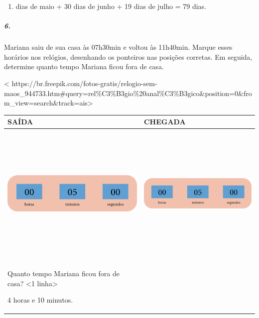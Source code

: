 \begin{enumerate}
\def\labelenumi{\arabic{enumi}.}
\setcounter{enumi}{30}
\item
  dias de maio + 30 dias de junho + 19 dias de julho = 79 dias.
\end{enumerate}

\subparagraph{6.}\label{section-48}

Mariana saiu de sua casa às 07h30min e voltou às 11h40min. Marque esses
horários nos relógios, desenhando os ponteiros nas posições
corretas. Em seguida, determine quanto tempo Mariana ficou fora de casa.

\textless{}
https://br.freepik.com/fotos-gratis/relogio-sem-maos\_944733.htm\#query=rel\%C3\%B3gio\%20anal\%C3\%B3gico\&position=0\&from\_view=search\&track=ais\textgreater{}

\begin{longtable}[]{@{}ll@{}}
\toprule
SAÍDA & CHEGADA\tabularnewline
\midrule
\endhead
\includegraphics[width=2.71875in,height=2.65625in]{media/image61.png} &
\includegraphics[width=2.71875in,height=2.65625in]{media/image61.png}\tabularnewline
\begin{minipage}[t]{0.48\columnwidth}\raggedright\strut
Quanto tempo Mariana ficou fora de casa? \textless{}1
linha\textgreater{}

4 horas e 10 minutos.\strut
\end{minipage}\tabularnewline
\bottomrule
\end{longtable}

